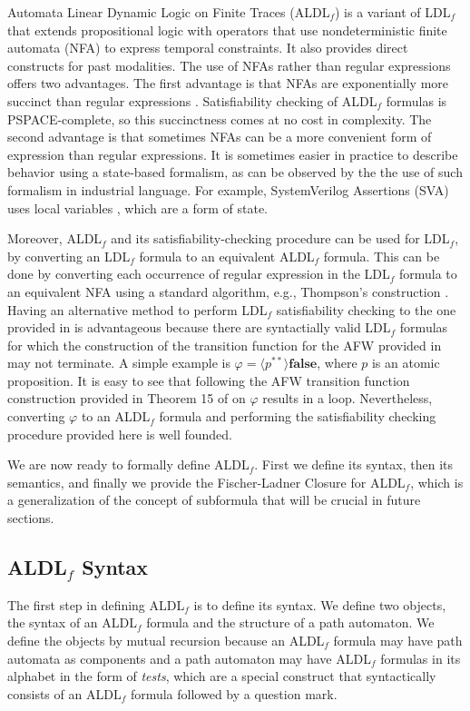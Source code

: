 \documentclass[10pt,a4paper]{amsart}
\theoremstyle{plain}
\theoremstyle{definition}
\theoremstyle{definition}
\newcommand{\dbox}[1]{\langle #1 \rangle}
\DeclareMathOperator{\?}{?}
\begin{document}
\label{ch:introducingaldlf}
Automata Linear Dynamic Logic on Finite Traces (ALDL$_f$) is a variant of LDL$_f$ that extends propositional logic with operators that use nondeterministic finite automata (NFA) to express temporal constraints. It also provides direct constructs for past modalities. The use of NFAs rather than regular expressions offers two advantages. The first advantage is that NFAs are exponentially more succinct than regular expressions \cite{gruber1,gruber2}. Satisfiability checking of ALDL$_f$ formulas is PSPACE-complete, so this succinctness comes at no cost in complexity. The second advantage is that sometimes NFAs can be a more convenient form of expression than regular expressions. It is sometimes easier in practice to describe behavior using a state-based formalism, as can be observed by the the use of such formalism in industrial language. For example, SystemVerilog Assertions (SVA) uses local variables \cite{sva}, which are a form of state.

Moreover, ALDL$_f$ and its satisfiability-checking procedure can be used for LDL$_f$, by converting an LDL$_f$ formula to an equivalent ALDL$_f$ formula. This can be done by converting each occurrence of regular expression in the LDL$_f$ formula to an equivalent NFA using a standard algorithm, e.g., Thompson's construction \cite{thompson}. Having an alternative method to perform LDL$_f$ satisfiability checking to the one provided in \cite{ldlf} is advantageous because there are syntactially valid LDL$_f$ formulas for which the construction of the transition function for the AFW provided in \cite{ldlf} may not terminate. A simple example is $\varphi = \dbox{p^{**}}\textbf{false}$, where $p$ is an atomic proposition. It is easy to see that following the AFW transition function construction provided in Theorem 15 of \cite{ldlf} on $\varphi$ results in a loop. Nevertheless, converting $\varphi$ to an ALDL$_f$ formula and performing the satisfiability checking procedure provided here is well founded.

We are now ready to formally define ALDL$_f$. First we define its syntax, then its semantics, and finally we provide the Fischer-Ladner Closure for ALDL$_f$, which is a generalization of the concept of subformula that will be crucial in future sections.

\subsection{\texorpdfstring{ALDL$_f$ Syntax}{ALDLf Syntax}}
The first step in defining ALDL$_f$ is to define its syntax. We define two objects, the syntax of an ALDL$_f$ formula and the structure of a path automaton.
We define the objects by mutual recursion because an ALDL$_f$ formula may have path automata as components
and a path automaton may have ALDL$_f$ formulas in its alphabet in the form of \textit{tests}, which are a special construct
that syntactically consists of an ALDL$_f$ formula followed by a question mark.
\end{document}

